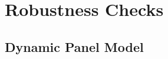 \documentclass[mnsc,blindrev]{informs3}
\begin{document}
	
	

\section{Robustness Checks} \label{Sec: Robustness}
	
\subsection{Dynamic Panel Model}  \label{Sec: Dynamic Panel}
	
\end{document}
